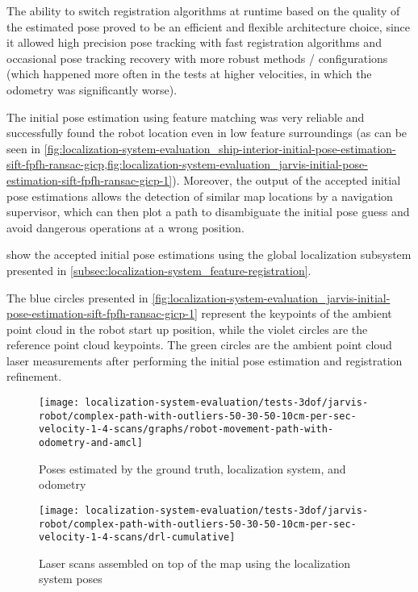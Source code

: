 The ability to switch registration algorithms at runtime based on the quality of the estimated pose proved to be an efficient and flexible architecture choice, since it allowed high precision pose tracking with fast registration algorithms and occasional pose tracking recovery with more robust methods / configurations (which happened more often in the tests at higher velocities, in which the odometry was significantly worse).

The initial pose estimation using feature matching was very reliable and successfully found the robot location even in low feature surroundings (as can be seen in \cref{fig:localization-system-evaluation_ship-interior-initial-pose-estimation-sift-fpfh-ransac-gicp,fig:localization-system-evaluation_jarvis-initial-pose-estimation-sift-fpfh-ransac-gicp-1}). Moreover, the output of the accepted initial pose estimations allows the detection of similar map locations by a navigation supervisor, which can then plot a path to disambiguate the initial pose guess and avoid dangerous operations at a wrong position.

 show the accepted initial pose estimations using the global localization subsystem presented in \cref{subsec:localization-system_feature-registration}.

The blue circles presented in \cref{fig:localization-system-evaluation_jarvis-initial-pose-estimation-sift-fpfh-ransac-gicp-1} represent the keypoints of the ambient point cloud in the robot start up position, while the violet circles are the reference point cloud keypoints. The green circles are the ambient point cloud laser measurements after performing the initial pose estimation and registration refinement.


\begin{figure}[H]
	\centering
	\texttt{[image: localization-system-evaluation/tests-3dof/jarvis-robot/complex-path-with-outliers-50-30-50-10cm-per-sec-velocity-1-4-scans/graphs/robot-movement-path-with-odometry-and-amcl]}
	\caption{Poses estimated by the ground truth, localization system,  and odometry}
	\label{fig:localization-system-evaluation_complex-path-with-outliers-50-30-50-10cm-per-sec-velocity-1-4-scans-paths}
\end{figure}

\begin{figure}[H]
	\centering
	\texttt{[image: localization-system-evaluation/tests-3dof/jarvis-robot/complex-path-with-outliers-50-30-50-10cm-per-sec-velocity-1-4-scans/drl-cumulative]}
	\caption{Laser scans assembled on top of the map using the localization system poses}
	\label{fig:localization-system-evaluation_complex-path-with-outliers-50-30-50-10cm-per-sec-velocity-1-4-scans-drl-cumulative}
\end{figure}

